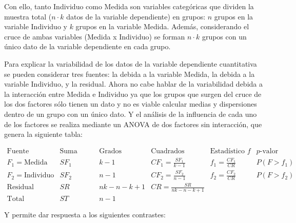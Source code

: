 Con ello, tanto Individuo como Medida son variables categóricas que dividen la muestra total ($n\cdot k$ datos de la
variable dependiente) en grupos: $n$ grupos en la variable Individuo y $k$ grupos en la variable Medida. Además,
considerando el cruce de ambas variables (Medida x Individuo) se forman $n\cdot k$ grupos con un único dato de la
variable dependiente en cada grupo.

Para explicar la variabilidad de los datos de la variable dependiente cuantitativa se pueden considerar tres fuentes: la
debida a la variable Medida, la debida a la variable Individuo, y la residual. Ahora no cabe hablar de la variabilidad
debida a la interacción entre Medida e Individuo ya que los grupos que surgen del cruce de los dos factores sólo tienen
un dato y no es viable calcular medias y dispersiones dentro de un grupo con un único dato. Y el análisis de la
influencia de cada uno de los factores se realiza mediante un ANOVA de dos factores sin interacción, que genera la
siguiente tabla:

\[
\renewcommand{\arraystretch}{2}
\begin{array}{cccccc}
\hline
\text{Fuente} & \text{Suma Cuadrados} & \text {Grados Libertad} & \text{Cuadrados Medios} & \text{Estadístico $f$} & \text{$p$-valor}\\
\hline
F_1=\text{Medida} & SF_1 & k-1 & CF_1=\frac{SF_1}{k-1} & f_1=\frac{CF_1}{CR} & P(F>f_1) \\
F_2=\text{Individuo} & SF_2 & n-1 & CF_2=\frac{SF_2}{n-1} & f_2=\frac{CF_2}{CR} & P(F>f_2) \\
\text{Residual} & SR & nk-n-k+1 & CR=\frac{SR}{nk-n-k+1} &  &  \\
\hline
\text{Total} & ST & n-1 &  &  & 
\end{array}
\]

Y permite dar respuesta a los siguientes contrastes:

